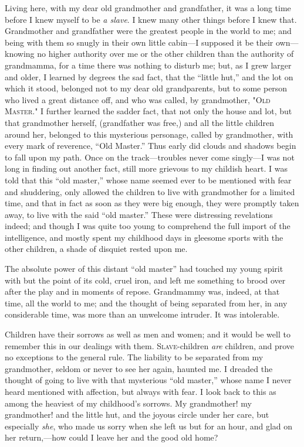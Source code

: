 Living here, with my dear old grandmother and grandfather, it was a long
time before I knew myself to be \emph{a slave}. I knew many other things
before I knew that. Grandmother and grandfather were the greatest people
in the world to me; and being with them so snugly in their own little
cabin---I supposed it be their own---knowing no higher authority over me
or the other children than the authority of grandmamma, for a time there
was nothing to disturb me; but, as I grew larger and older, I learned by
degrees the sad fact, that the ``little hut,'' and the lot on which it
stood, belonged not to my dear old grandparents, but to some person who
lived a great distance off, and who was called, by grandmother,
"\textsc{Old Master}." I further learned the sadder fact, that not only
the house and lot, but that grandmother herself,
{\protect\hypertarget{39}{}{}}(grandfather was free,) and all the little
children around her, belonged to this mysterious personage, called by
grandmother, with every mark of reverence, ``Old Master.'' Thus early
did clouds and shadows begin to fall upon my path. Once on the
track---troubles never come singly---I was not long in finding out
another fact, still more grievous to my childish heart. I was told that
this ``old master,'' whose name seemed ever to be mentioned with fear
and shuddering, only allowed the children to live with grandmother for a
limited time, and that in fact as soon as they were big enough, they
were promptly taken away, to live with the said ``old master.'' These
were distressing revelations indeed; and though I was quite too young to
comprehend the full import of the intelligence, and mostly spent my
childhood days in gleesome sports with the other children, a shade of
disquiet rested upon me.

The absolute power of this distant ``old master'' had touched my young
spirit with but the point of its cold, cruel iron, and left me something
to brood over after the play and in moments of repose. Grandmammy was,
indeed, at that time, all the world to me; and the thought of being
separated from her, in any considerable time, was more than an unwelcome
intruder. It was intolerable.

Children have their sorrows as well as men and women; and it would be
well to remember this in our dealings with them. \textsc{Slave}-children
\emph{are} children, and prove no exceptions to the general rule. The
liability to be separated from my grandmother, seldom or never to see
her again, haunted me. I dreaded {\protect\hypertarget{40}{}{}}the
thought of going to live with that mysterious ``old master,'' whose name
I never heard mentioned with affection, but always with fear. I look
back to this as among the heaviest of my childhood's sorrows. My
grandmother! my grandmother! and the little hut, and the joyous circle
under her care, but especially \emph{she}, who made us sorry when she
left us but for an hour, and glad on her return,---how could I leave her
and the good old home?

